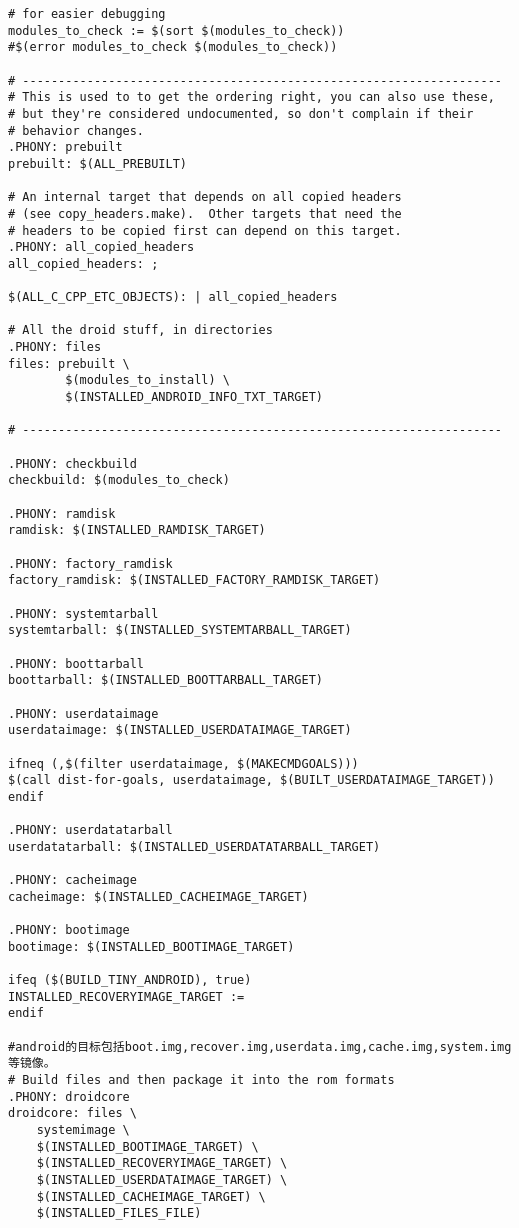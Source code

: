 \documentclass[12pt,a4paper]{article}
\begin{document}
\begin{verbatim}
# for easier debugging
modules_to_check := $(sort $(modules_to_check))
#$(error modules_to_check $(modules_to_check))

# -------------------------------------------------------------------
# This is used to to get the ordering right, you can also use these,
# but they're considered undocumented, so don't complain if their
# behavior changes.
.PHONY: prebuilt
prebuilt: $(ALL_PREBUILT)

# An internal target that depends on all copied headers
# (see copy_headers.make).  Other targets that need the
# headers to be copied first can depend on this target.
.PHONY: all_copied_headers
all_copied_headers: ;

$(ALL_C_CPP_ETC_OBJECTS): | all_copied_headers

# All the droid stuff, in directories
.PHONY: files
files: prebuilt \
        $(modules_to_install) \
        $(INSTALLED_ANDROID_INFO_TXT_TARGET)

# -------------------------------------------------------------------

.PHONY: checkbuild
checkbuild: $(modules_to_check)

.PHONY: ramdisk
ramdisk: $(INSTALLED_RAMDISK_TARGET)

.PHONY: factory_ramdisk
factory_ramdisk: $(INSTALLED_FACTORY_RAMDISK_TARGET)

.PHONY: systemtarball
systemtarball: $(INSTALLED_SYSTEMTARBALL_TARGET)

.PHONY: boottarball
boottarball: $(INSTALLED_BOOTTARBALL_TARGET)

.PHONY: userdataimage
userdataimage: $(INSTALLED_USERDATAIMAGE_TARGET)

ifneq (,$(filter userdataimage, $(MAKECMDGOALS)))
$(call dist-for-goals, userdataimage, $(BUILT_USERDATAIMAGE_TARGET))
endif

.PHONY: userdatatarball
userdatatarball: $(INSTALLED_USERDATATARBALL_TARGET)

.PHONY: cacheimage
cacheimage: $(INSTALLED_CACHEIMAGE_TARGET)

.PHONY: bootimage
bootimage: $(INSTALLED_BOOTIMAGE_TARGET)

ifeq ($(BUILD_TINY_ANDROID), true)
INSTALLED_RECOVERYIMAGE_TARGET :=
endif

#android的目标包括boot.img,recover.img,userdata.img,cache.img,system.img等镜像。
# Build files and then package it into the rom formats
.PHONY: droidcore
droidcore: files \
	systemimage \
	$(INSTALLED_BOOTIMAGE_TARGET) \
	$(INSTALLED_RECOVERYIMAGE_TARGET) \
	$(INSTALLED_USERDATAIMAGE_TARGET) \
	$(INSTALLED_CACHEIMAGE_TARGET) \
	$(INSTALLED_FILES_FILE)


\end{verbatim}
\end{document}
